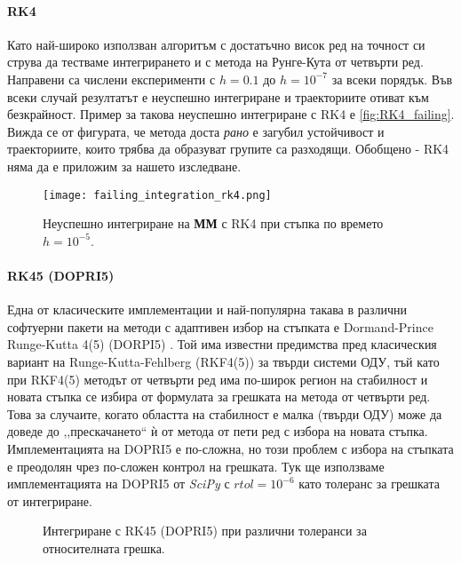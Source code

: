 \paragraph{RK4} Като най-широко използван алгоритъм с достатъчно висок ред на точност си струва да тестваме интегрирането и с метода на Рунге-Кута от четвърти ред. Направени са числени експерименти с $h = 0.1$ до $h = 10^{-7}$ за всеки порядък. Във всеки случай резултатът е неуспешно интегриране и траекториите отиват към безкрайност. Пример за такова неуспешно интегриране с RK4 е \autoref{fig:RK4_failing}. Вижда се от фигурата, че метода доста \textit{рано} е загубил устойчивост и траекториите, които трябва да образуват групите са разходящи. Обобщено - RK4 няма да е приложим за нашето изследване.
\begin{figure}[htbp]
	\centering
	\texttt{[image: failing\_integration\_rk4.png]}
	\caption{Неуспешно интегриране на \textbf{ММ} с RK4 при стъпка по времето $h = 10^{-5}$.}
	\label{fig:RK4_failing}
\end{figure}

\paragraph{RK45 (DOPRI5)} Една от класическите имплементации и най-популярна такава в различни софтуерни пакети на методи с адаптивен избор на стъпката е Dormand-Prince Runge-Kutta 4(5) (DORPI5) \cite{Dormand1980}. Той има известни предимства пред класическия вариант на Runge-Kutta-Fehlberg (RKF4(5)) \cite{Fehlberg1970} за твърди системи ОДУ, тъй като при RKF4(5) методът от четвърти ред има по-широк регион на стабилност и новата стъпка се избира от формулата за грешката на метода от четвърти ред. Това за случаите, когато областта на стабилност е малка (твърди ОДУ) може да доведе до ,,прескачането`` ѝ от метода от пети ред с избора на новата стъпка. Имплементацията на DOPRI5 е по-сложна, но този проблем с избора на стъпката е преодолян чрез по-сложен контрол на грешката. Тук ще използваме имплементацията на DOPRI5 от \textit{SciPy} с $rtol=10^{-6}$ като толеранс за грешката от интегриране.
\begin{figure}[hbpt]
    \centering
    \caption{Интегриране с RK45 (DOPRI5) при различни толеранси за относителната грешка.}
    \label{fig:dopri5_integration_results}
\end{figure}


